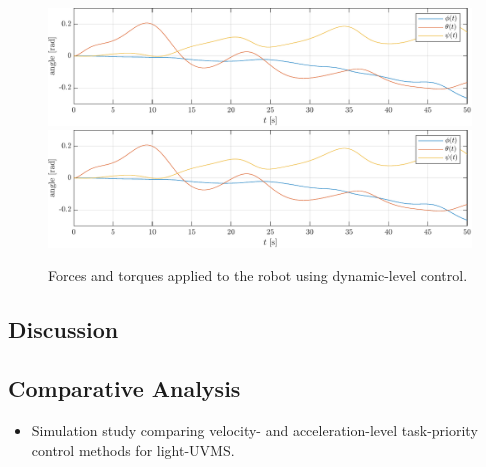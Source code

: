 \begin{figure}[h!]
    \centering
    \includegraphics[page=7,width=\linewidth]{assets/results/dynamic/plot.pdf}
    \includegraphics[page=8,width=\linewidth]{assets/results/dynamic/plot.pdf}
    \caption{Forces and torques applied to the robot using dynamic-level control.}
\end{figure}

\FloatBarrier

\subsection{Discussion}
\subsection{Comparative Analysis}

\begin{itemize}
    \item Simulation study comparing velocity- and acceleration-level task-priority
        control methods for light-UVMS.
\end{itemize}
